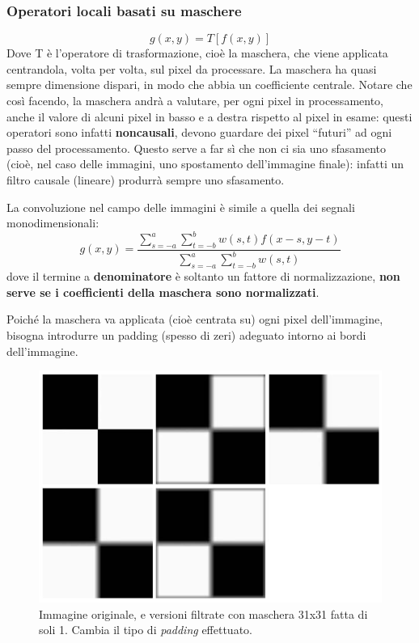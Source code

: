 \documentclass[a4paper,11pt]{article}
\begin{document}
\subsubsection{Operatori locali basati su maschere}
\[
g(x,y) = T[f(x,y)]
\]
Dove T è l'operatore di trasformazione, cioè la maschera, che viene applicata centrandola, volta per volta, sul pixel da processare.
La maschera ha quasi sempre dimensione dispari, in modo che abbia un coefficiente centrale.
Notare che così facendo, la maschera andrà a valutare, per ogni pixel in processamento, anche il valore di alcuni pixel in basso e a destra rispetto
al pixel in esame: questi operatori sono infatti \textbf{noncausali}, devono guardare dei pixel ``futuri'' ad ogni passo del processamento.
Questo serve a far sì che non ci sia uno sfasamento (cioè, nel caso delle immagini, uno spostamento dell'immagine finale): infatti un filtro causale (lineare) produrrà sempre uno sfasamento.
\par
La convoluzione nel campo delle immagini è simile a quella dei segnali monodimensionali:
\[
g(x,y) = \frac{
\sum_{s=-a}^{a} \sum_{t=-b}^{b} w(s,t) f(x-s, y-t)
}{
\sum_{s=-a}^{a} \sum_{t=-b}^{b} w(s,t)
}
\]
dove il termine a \textbf{denominatore} è soltanto un fattore di normalizzazione, \textbf{non serve se i coefficienti della maschera sono normalizzati}.
\par
Poiché la maschera va applicata (cioè centrata su) ogni pixel dell'immagine, bisogna introdurre un padding (spesso di zeri) adeguato intorno ai
bordi dell'immagine.

\newpage
\renewcommand{\thefigure}{5.25}
\begin{figure}[!h]
  \centering
    \includegraphics[scale=0.4]{images/5/chess_lp.png}
    \caption{Immagine originale, e versioni filtrate con maschera 31x31 fatta di soli 1. Cambia il tipo di \textit{padding} effettuato.}
\end{figure}
\end{document}
